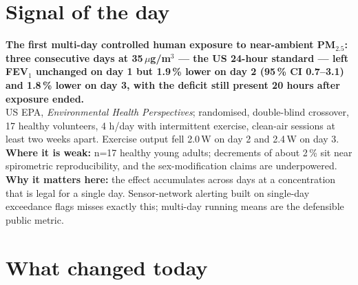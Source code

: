\documentclass[10pt]{article}
\begin{document}
\vspace{6mm}

\section*{\sffamily\bfseries\color{Deep}Signal of the day}
\vspace{-1.5mm}{\color{Amber}\rule{\linewidth}{1.1pt}}\vspace{2.5mm}

\begin{keybox}
{\sffamily\bfseries\small\color{Deep}The first multi-day controlled human exposure to near-ambient PM$_{2.5}$: three consecutive days at 35\,$\mu$g/m$^3$ --- the US 24-hour standard --- left FEV$_1$ unchanged on day 1 but 1.9\,\% lower on day 2 (95\,\% CI 0.7--3.1) and 1.8\,\% lower on day 3, with the deficit still present 20 hours after exposure ended.}\\[1.4mm]
\footnotesize
US EPA, \textit{Environmental Health Perspectives}; randomised, double-blind crossover, 17 healthy volunteers, 4 h/day with intermittent exercise, clean-air sessions at least two weeks apart. Exercise output fell 2.0\,W on day 2 and 2.4\,W on day 3.
\textbf{Where it is weak:} n=17 healthy young adults; decrements of about 2\,\% sit near spirometric reproducibility, and the sex-modification claims are underpowered.
\textbf{Why it matters here:} the effect accumulates across days at a concentration that is legal for a single day. Sensor-network alerting built on single-day exceedance flags misses exactly this; multi-day running means are the defensible public metric.\par
\end{keybox}

\vspace{3mm}

\section*{\sffamily\bfseries\color{Deep}What changed today}
\vspace{-1.5mm}{\color{Amber}\rule{\linewidth}{1.1pt}}\vspace{2.5mm}
\end{document}
